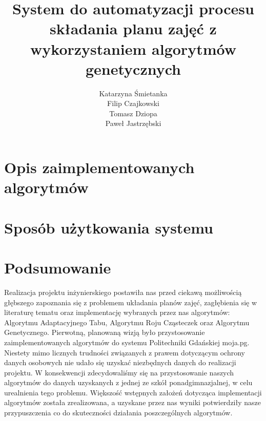 \documentclass[11pt]{report}
\title{System do automatyzacji procesu składania planu zajęć z wykorzystaniem algorytmów genetycznych}
\author{
	Katarzyna Śmietanka \\
	Filip Czajkowski \\
	Tomasz Dziopa\\
	Paweł Jastrzębski
}
\begin{document}
%
%

\maketitle
\tableofcontents









\chapter{Opis zaimplementowanych algorytmów}








\chapter{Sposób użytkowania systemu}

\chapter{Podsumowanie}
\par Realizacja projektu inżynierskiego postawiła nas przed ciekawą możliwością głębszego zapoznania się z problemem układania planów zajęć, zagłębienia się w literaturę tematu oraz implementację wybranych przez nas algorytmów: Algorytmu Adaptacyjnego Tabu, Algorytmu Roju Cząsteczek oraz Algorytmu Genetycznego.  Pierwotną, planowaną wizją było przystosowanie zaimplementowanych algorytmów do systemu Politechniki Gdańskiej moja.pg. Niestety mimo licznych trudności związanych z prawem dotyczącym ochrony danych osobowych nie udało się uzyskać niezbędnych danych do realizacji projektu. W konsekwencji zdecydowaliśmy się na przystosowanie naszych algorytmów do danych uzyskanych z jednej ze szkół ponadgimnazjalnej, w celu urealnienia tego problemu. Większość  wstępnych założeń dotycząca implementacji algorytmów została zrealizowana, a uzyskane przez nas wyniki potwierdziły nasze przypuszczenia co do skuteczności  działania poszczególnych algorytmów. 
\end{document}
